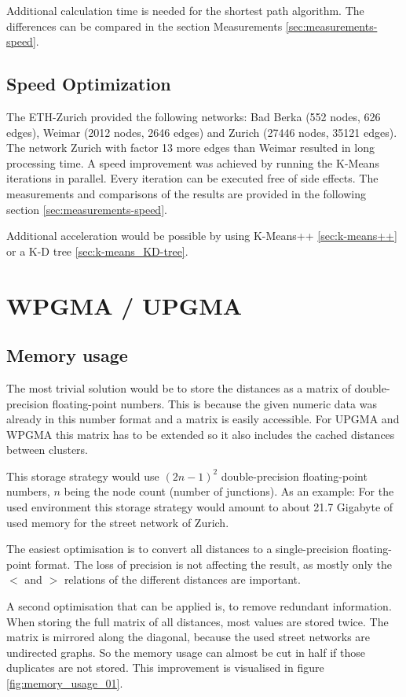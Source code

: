 Additional calculation time is needed for the shortest path algorithm. The differences can be compared in the section Measurements \ref{sec:measurements-speed}.

\subsection{Speed Optimization}
The ETH-Zurich provided the following networks: Bad Berka (552 nodes, 626 edges), Weimar (2012 nodes, 2646 edges) and Zurich (27446 nodes, 35121 edges). The network Zurich with factor 13 more edges than Weimar resulted in long processing time. A speed improvement was achieved by running the K-Means iterations in parallel. Every iteration can be executed free of side effects. The measurements and comparisons of the results are provided in the following section \ref{sec:measurements-speed}.

Additional acceleration would be possible by using K-Means++ \ref{sec:k-means++} or a K-D tree \ref{sec:k-means_KD-tree}.

\pagebreak
\section{WPGMA / UPGMA}
\subsection{Memory usage} \label{sec:memory_usage}
The most trivial solution would be to store the distances as a matrix of double-precision floating-point numbers. This is because the given numeric data was already in this number format and a matrix is easily accessible. For \acrshort{UPGMA} and \acrshort{WPGMA} this matrix has to be extended so it also includes the cached distances between clusters.

This storage strategy would use $(2n-1)^2$ double-precision floating-point numbers, $n$ being the node count (number of junctions). As an example: For the used environment this storage strategy would amount to about 21.7 Gigabyte of used memory for the street network of Zurich.

The easiest optimisation is to convert all distances to a single-precision floating-point format. The loss of precision is not affecting the result, as mostly only the $<$ and $>$ relations of the different distances are important.

A second optimisation that can be applied is, to remove redundant information. When storing the full matrix of all distances, most values are stored twice. The matrix is mirrored along the diagonal, because the used street networks are undirected graphs. So the memory usage can almost be cut in half if those duplicates are not stored. This improvement is visualised in figure \ref{fig:memory_usage_01}.

